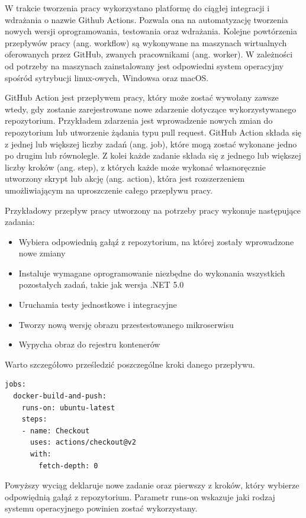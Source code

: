\documentclass[11pt, a4]{article} %
\begin{document}
W trakcie tworzenia pracy wykorzystano platformę do ciągłej integracji i wdrażania 
o nazwie Github Actions. Pozwala ona na automatyzację tworzenia nowych wersji 
oprogramowania, testowania oraz wdrażania. Kolejne powtórzenia przepływów pracy 
(ang. workflow) są wykonywane na maszynach wirtualnych oferowanych przez 
GitHub, zwanych pracownikami (ang. worker). W zależności od potrzeby na maszynach 
zainstalowany jest odpowiedni system operacyjny spośród sytrybucji 
linux-owych, Windowsa oraz macOS.

GitHub Action jest przepływem pracy, który może zostać wywołany zawsze wtedy, gdy 
zostanie zarejestrowane nowe zdarzenie dotyczące wykorzystywanego repozytorium. 
Przykładem zdarzenia jest wprowadzenie nowych zmian do repozytorium lub utworzenie 
żądania typu pull request. GitHub Action składa się z jednej lub większej liczby 
zadań (ang. job), które mogą zostać wykonane jedno po drugim lub równolegle. Z kolei 
każde zadanie składa się z jednego lub większej liczby kroków (ang. step), z których 
każde może wykonać własnoręcznie utworzony skrypt lub akcję (ang. action), która jest 
rozszerzeniem umożliwiającym na uproszczenie całego przepływu pracy.

Przykładowy przepływ pracy utworzony na potrzeby pracy wykonuje następujące zadania:

\begin{itemize} %
    \item Wybiera odpowiednią gałąź z repozytorium, na której zostały wprowadzone 
    nowe zmiany
    \item Instaluje wymagane oprogramowanie niezbędne do wykonania wszystkich 
    pozostałych zadań, takie jak wersja .NET 5.0
    \item Uruchamia testy jednostkowe i integracyjne
    \item Tworzy nową wersję obrazu przestestowanego mikroserwisu
    \item Wypycha obraz do rejestru kontenerów
\end{itemize}

Warto szczegółowo prześledzić poszczególne kroki danego przepływu.

\begin{lstlisting}
jobs:
  docker-build-and-push:
    runs-on: ubuntu-latest
    steps:
    - name: Checkout
      uses: actions/checkout@v2
      with:
        fetch-depth: 0
\end{lstlisting}

Powyższy wyciąg deklaruje nowe zadanie oraz pierwszy z kroków, który wybierze 
odpowiędnią gałąź z repozytorium. Parametr runs-on wskazuje jaki rodzaj systemu 
operacyjnego powinien zostać wykorzystany.
\end{document}
